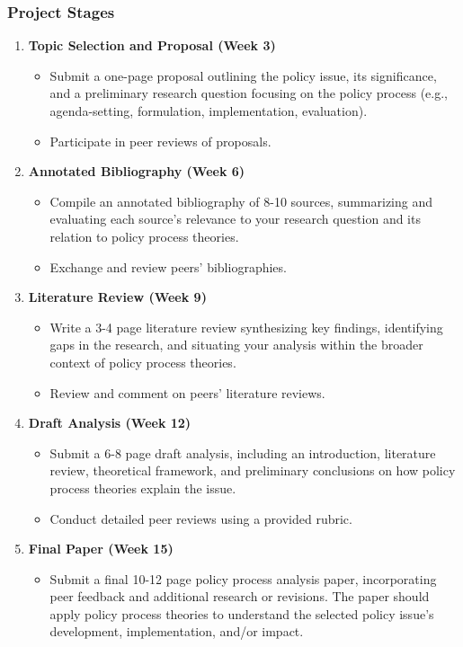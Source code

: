 \documentclass[12pt, letterpaper]{article}
\begin{document}
\subsubsection*{Project Stages}
\begin{enumerate}
    \item \textbf{Topic Selection and Proposal (Week 3)}
    \begin{itemize}
        \item Submit a one-page proposal outlining the policy issue, its significance, and a preliminary research question focusing on the policy process (e.g., agenda-setting, formulation, implementation, evaluation).
        \item Participate in peer reviews of proposals.
    \end{itemize}
    \item \textbf{Annotated Bibliography (Week 6)}
    \begin{itemize}
        \item Compile an annotated bibliography of 8-10 sources, summarizing and evaluating each source's relevance to your research question and its relation to policy process theories.
        \item Exchange and review peers' bibliographies.
    \end{itemize}
    \item \textbf{Literature Review (Week 9)}
    \begin{itemize}
        \item Write a 3-4 page literature review synthesizing key findings, identifying gaps in the research, and situating your analysis within the broader context of policy process theories.
        \item Review and comment on peers' literature reviews.
    \end{itemize}
    \item \textbf{Draft Analysis (Week 12)}
    \begin{itemize}
        \item Submit a 6-8 page draft analysis, including an introduction, literature review, theoretical framework, and preliminary conclusions on how policy process theories explain the issue.
        \item Conduct detailed peer reviews using a provided rubric.
    \end{itemize}
    \item \textbf{Final Paper (Week 15)}
    \begin{itemize}
        \item Submit a final 10-12 page policy process analysis paper, incorporating peer feedback and additional research or revisions. The paper should apply policy process theories to understand the selected policy issue's development, implementation, and/or impact.
    \end{itemize}
\end{enumerate}
\end{document}
